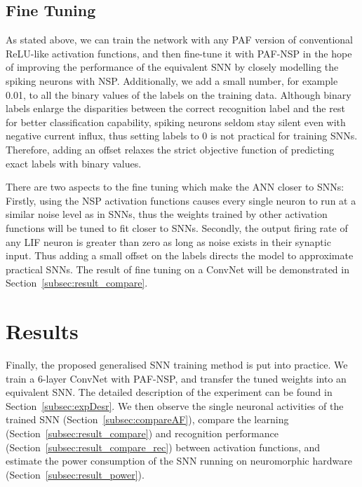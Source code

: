 	\subsection{Fine Tuning}
	\label{subsec:finetune}
	As stated above, we can train the network with any PAF version of conventional ReLU-like activation functions, and then fine-tune it with PAF-NSP in the hope of improving the performance of the equivalent SNN by closely modelling the spiking neurons with NSP.
	Additionally, we add a small number, for example 0.01, to all the binary values of the labels on the training data.
	Although binary labels enlarge the disparities between the correct recognition label and the rest for better classification capability, 
	spiking neurons seldom stay silent even with negative current influx, thus setting labels to 0 is not practical for training SNNs.
	Therefore, adding an offset relaxes the strict objective function of predicting exact labels with binary values.

	
	There are two aspects to the fine tuning which make the ANN closer to SNNs:
	Firstly, using the NSP activation functions causes every single neuron to run at a similar noise level as in SNNs, thus the weights trained by other activation functions will be tuned to fit closer to SNNs.
	Secondly, the output firing rate of any LIF neuron is greater than zero as long as noise exists in their synaptic input.
	Thus adding a small offset on the labels directs the model to approximate practical SNNs. 
	The result of fine tuning on a ConvNet will be demonstrated in Section~\ref{subsec:result_compare}.

\section{Results}
\label{sec:iconipResult}
	Finally, the proposed generalised SNN training method is put into practice.
	We train a 6-layer ConvNet with PAF-NSP, and transfer the tuned weights into an equivalent SNN.
	The detailed description of the experiment can be found in Section~\ref{subsec:expDesr}.
	We then observe the single neuronal activities of the trained SNN (Section~\ref{subsec:compareAF}), compare the learning (Section~\ref{subsec:result_compare}) and recognition performance (Section~\ref{subsec:result_compare_rec}) between activation functions, and estimate the power consumption of the SNN running on neuromorphic hardware (Section~\ref{subsec:result_power}).  

